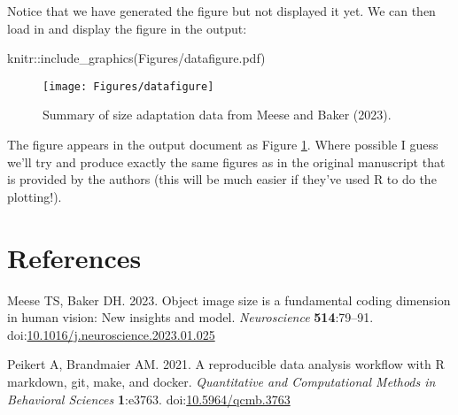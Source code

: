 \documentclass[
]{article}
\newenvironment{Shaded}{\begin{snugshade}}{\end{snugshade}}
\newcommand{\FunctionTok}[1]{\textcolor[rgb]{0.00,0.00,0.00}{#1}}
\newcommand{\NormalTok}[1]{#1}
\newcommand{\SpecialCharTok}[1]{\textcolor[rgb]{0.00,0.00,0.00}{#1}}
\newcommand{\StringTok}[1]{\textcolor[rgb]{0.31,0.60,0.02}{#1}}
\newlength{\cslhangindent}
\newlength{\cslentryspacingunit} %
\newenvironment{CSLReferences}[2] %
 {%
  \setlength{\parindent}{0pt}
  \ifodd #1
  \let\oldpar\par
  \def\par{\hangindent=\cslhangindent\oldpar}
  \fi
  \setlength{\parskip}{#2\cslentryspacingunit}
 }%
 {}
\begin{document}
Notice that we have generated the figure but not displayed it yet. We can then load in and display the figure in the output:

\begin{Shaded}
\begin{Highlighting}[]
\NormalTok{knitr}\SpecialCharTok{::}\FunctionTok{include\_graphics}\NormalTok{(}\StringTok{\textquotesingle{}Figures/datafigure.pdf\textquotesingle{}}\NormalTok{)}
\end{Highlighting}
\end{Shaded}

\begin{figure}

{\centering \texttt{[image: Figures/datafigure]} 

}

\caption{Summary of size adaptation data from Meese and Baker (2023).}\label{fig:datafig}
\end{figure}

The figure appears in the output document as Figure \ref{fig:datafig}. Where possible I guess we'll try and produce exactly the same figures as in the original manuscript that is provided by the authors (this will be much easier if they've used R to do the plotting!).

\hypertarget{references}{%
\section*{References}\label{references}}

\hypertarget{refs}{}
\begin{CSLReferences}{1}{0}
\leavevmode{}%
Meese TS, Baker DH. 2023. Object image size is a fundamental coding dimension in human vision: New insights and model. \emph{Neuroscience} \textbf{514}:79--91. doi:\href{https://doi.org/10.1016/j.neuroscience.2023.01.025}{10.1016/j.neuroscience.2023.01.025}

\leavevmode{}%
Peikert A, Brandmaier AM. 2021. A reproducible data analysis workflow with {R} markdown, git, make, and docker. \emph{Quantitative and Computational Methods in Behavioral Sciences} \textbf{1}:e3763. doi:\href{https://doi.org/10.5964/qcmb.3763}{10.5964/qcmb.3763}

\end{CSLReferences}
\end{document}
